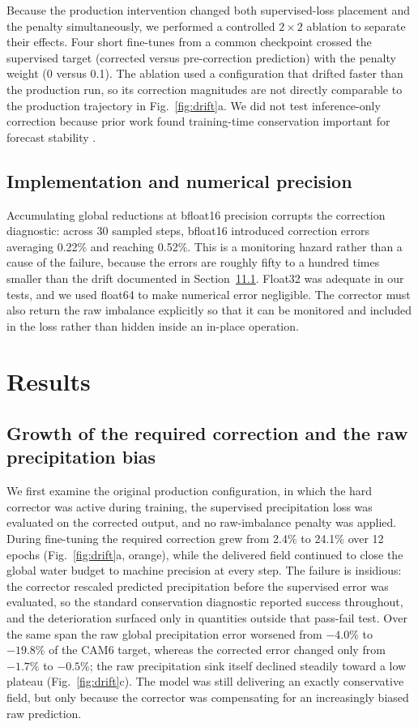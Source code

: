 \documentclass{ametsocV6.1}
\begin{document}
Because the production intervention changed both supervised-loss placement and the penalty simultaneously, we performed a controlled $2\times2$ ablation to separate their effects. Four short fine-tunes from a common checkpoint crossed the supervised target (corrected versus pre-correction prediction) with the penalty weight (0 versus 0.1). The ablation used a configuration that drifted faster than the production run, so its correction magnitudes are not directly comparable to the production trajectory in Fig.~\ref{fig:drift}a. We did not test inference-only correction because prior work found training-time conservation important for forecast stability \citep{sha2025}.

\subsection{Implementation and numerical precision}

Accumulating global reductions at bfloat16 precision corrupts the correction diagnostic: across 30 sampled steps, bfloat16 introduced correction errors averaging 0.22\% and reaching 0.52\%. This is a monitoring hazard rather than a cause of the failure, because the errors are roughly fifty to a hundred times smaller than the drift documented in Section~\ref{sec:results}\ref{sec:growth}. Float32 was adequate in our tests, and we used float64 to make numerical error negligible. The corrector must also return the raw imbalance explicitly so that it can be monitored and included in the loss rather than hidden inside an in-place operation.

\section{Results}\label{sec:results}

\subsection{Growth of the required correction and the raw precipitation bias}\label{sec:growth}

We first examine the original production configuration, in which the hard corrector was active during training, the supervised precipitation loss was evaluated on the corrected output, and no raw-imbalance penalty was applied. During fine-tuning the required correction grew from 2.4\% to 24.1\% over 12 epochs (Fig.~\ref{fig:drift}a, orange), while the delivered field continued to close the global water budget to machine precision at every step. The failure is insidious: the corrector rescaled predicted precipitation before the supervised error was evaluated, so the standard conservation diagnostic reported success throughout, and the deterioration surfaced only in quantities outside that pass-fail test. Over the same span the raw global precipitation error worsened from $-4.0\%$ to $-19.8\%$ of the CAM6 target, whereas the corrected error changed only from $-1.7\%$ to $-0.5\%$; the raw precipitation sink itself declined steadily toward a low plateau (Fig.~\ref{fig:drift}c). The model was still delivering an exactly conservative field, but only because the corrector was compensating for an increasingly biased raw prediction.
\end{document}
